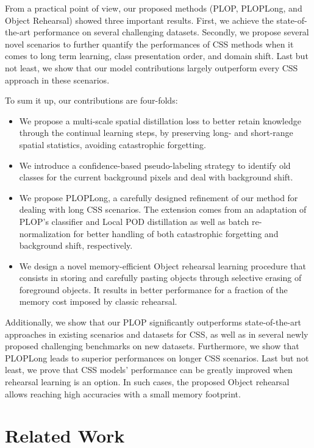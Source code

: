 From a practical point of view, our proposed methods (PLOP, PLOPLong, and Object Rehearsal) showed
three important results. First, we achieve the state-of-the-art performance on several challenging
datasets. Secondly, we propose several novel scenarios to further quantify the performances of
\ac{CSS} methods when it comes to long term learning, class presentation order, and domain shift.
Last but not least, we show that our model contributions largely outperform every \ac{CSS} approach
in these scenarios.

To sum it up, our contributions are four-folds:
\begin{itemize}
    \item We propose a multi-scale spatial distillation loss to better retain knowledge through the
          continual learning steps, by preserving long- and short-range spatial statistics, avoiding
          catastrophic forgetting.
    \item We introduce a confidence-based pseudo-labeling strategy to identify old classes for the
          current background pixels and deal with background shift.
    \item We propose PLOPLong, a carefully designed refinement of our method for dealing with long
          \ac{CSS} scenarios. The extension comes from an adaptation of PLOP's classifier and Local
          POD distillation as well as batch re-normalization for better handling of both
          catastrophic forgetting and background shift, respectively.
    \item We design a novel memory-efficient Object rehearsal learning procedure that consists in
          storing and carefully pasting objects through selective erasing of foreground objects. It
          results in better performance for a fraction of the memory cost imposed by classic
          rehearsal.
\end{itemize}

Additionally, we show that our PLOP significantly outperforms state-of-the-art approaches in
existing scenarios and datasets for \ac{CSS}, as well as in several newly proposed challenging
benchmarks on new datasets. Furthermore, we show that PLOPLong leads to superior performances on
longer \ac{CSS} scenarios. Last but not least, we prove that \ac{CSS} models' performance can be
greatly improved when rehearsal learning is an option. In such cases, the proposed Object rehearsal
allows reaching high accuracies with a small memory footprint.

\section{Related Work}
\label{sec:seg_related}

